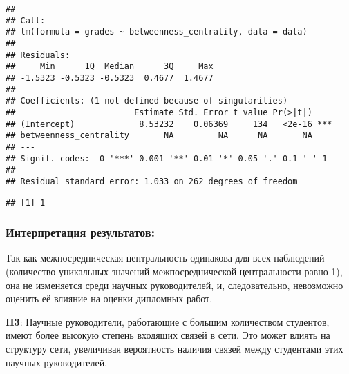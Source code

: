 \documentclass[
]{article}
\newenvironment{Shaded}{\begin{snugshade}}{\end{snugshade}}
\newcommand{\FunctionTok}[1]{\textcolor[rgb]{0.13,0.29,0.53}{\textbf{#1}}}
\newcommand{\NormalTok}[1]{#1}
\newcommand{\SpecialCharTok}[1]{\textcolor[rgb]{0.81,0.36,0.00}{\textbf{#1}}}
\begin{document}
\begin{verbatim}
## 
## Call:
## lm(formula = grades ~ betweenness_centrality, data = data)
## 
## Residuals:
##     Min      1Q  Median      3Q     Max 
## -1.5323 -0.5323 -0.5323  0.4677  1.4677 
## 
## Coefficients: (1 not defined because of singularities)
##                        Estimate Std. Error t value Pr(>|t|)    
## (Intercept)             8.53232    0.06369     134   <2e-16 ***
## betweenness_centrality       NA         NA      NA       NA    
## ---
## Signif. codes:  0 '***' 0.001 '**' 0.01 '*' 0.05 '.' 0.1 ' ' 1
## 
## Residual standard error: 1.033 on 262 degrees of freedom
\end{verbatim}

\begin{Shaded}
\end{Shaded}

\begin{verbatim}
## [1] 1
\end{verbatim}

\hypertarget{ux438ux43dux442ux435ux440ux43fux440ux435ux442ux430ux446ux438ux44f-ux440ux435ux437ux443ux43bux44cux442ux430ux442ux43eux432-4}{%
\subsubsection{Интерпретация
результатов:}\label{ux438ux43dux442ux435ux440ux43fux440ux435ux442ux430ux446ux438ux44f-ux440ux435ux437ux443ux43bux44cux442ux430ux442ux43eux432-4}}

Так как межпосредническая центральность одинакова для всех наблюдений
(количество уникальных значений межпосреднической центральности равно
1), она не изменяется среди научных руководителей, и, следовательно,
невозможно оценить её влияние на оценки дипломных работ.

\textbf{H3}: Научные руководители, работающие с большим количеством
студентов, имеют более высокую степень входящих связей в сети. Это может
влиять на структуру сети, увеличивая вероятность наличия связей между
студентами этих научных руководителей.
\end{document}
